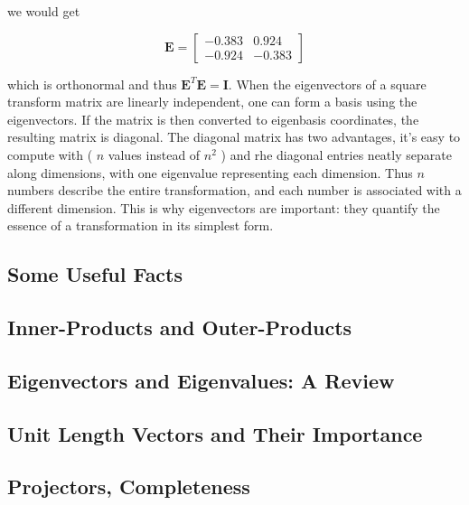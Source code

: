\documentclass[main.tex]{subfiles}
\begin{document}
    we would get
    
    $$
    \mathbf{E}=\left[\begin{array}{cc}
    -0.383 & 0.924 \\
    -0.924 & -0.383
    \end{array}\right]
    $$

    which is orthonormal and thus $\mathbf{E}^{T} \mathbf{E}=\mathbf{I}$. When the eigenvectors of a square transform matrix are linearly independent, one can form a basis using the eigenvectors. If the matrix is then converted to eigenbasis coordinates, the resulting matrix is diagonal. The diagonal matrix has two advantages, it's easy to compute with ( $n$ values instead of $n^{2}$ ) and rhe diagonal entries neatly separate along dimensions, with one eigenvalue representing each dimension. Thus $n$ numbers describe the entire transformation, and each number is associated with a different dimension. This is why eigenvectors are important: they quantify the essence of a transformation in its simplest form.
    
\subsection{Some Useful Facts}

\subsection{Inner-Products and Outer-Products}

\subsection{Eigenvectors and Eigenvalues: A Review}

\subsection{Unit Length Vectors and Their Importance}

\subsection{Projectors, Completeness}
\end{document}
